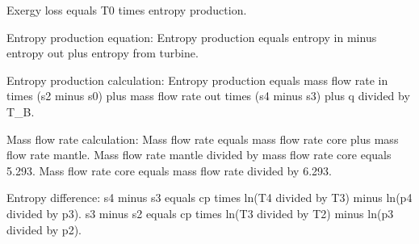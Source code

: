 Exergy loss equals T0 times entropy production.  

Entropy production equation:  
Entropy production equals entropy in minus entropy out plus entropy from turbine.  

Entropy production calculation:  
Entropy production equals mass flow rate in times (s2 minus s0) plus mass flow rate out times (s4 minus s3) plus q divided by T_B.  

Mass flow rate calculation:  
Mass flow rate equals mass flow rate core plus mass flow rate mantle.  
Mass flow rate mantle divided by mass flow rate core equals 5.293.  
Mass flow rate core equals mass flow rate divided by 6.293.  

Entropy difference:  
s4 minus s3 equals cp times ln(T4 divided by T3) minus ln(p4 divided by p3).  
s3 minus s2 equals cp times ln(T3 divided by T2) minus ln(p3 divided by p2).